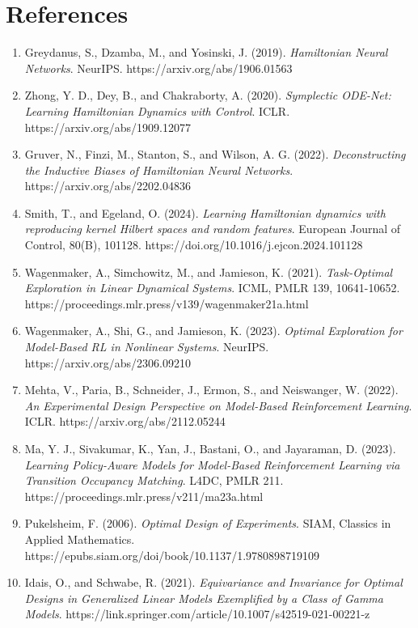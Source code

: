 \documentclass[
  10pt,
]{article}
\providecommand{\tightlist}{%
  \setlength{\itemsep}{0pt}\setlength{\parskip}{0pt}}
\begin{document}
\clearpage

\hypertarget{references}{%
\section*{References}\label{references}}

\begin{enumerate}
\def\labelenumi{\arabic{enumi}.}
\tightlist
\item
  Greydanus, S., Dzamba, M., and Yosinski, J. (2019). \emph{Hamiltonian
  Neural Networks}. NeurIPS. https://arxiv.org/abs/1906.01563
\item
  Zhong, Y. D., Dey, B., and Chakraborty, A. (2020). \emph{Symplectic
  ODE-Net: Learning Hamiltonian Dynamics with Control}. ICLR.
  https://arxiv.org/abs/1909.12077
\item
  Gruver, N., Finzi, M., Stanton, S., and Wilson, A. G. (2022).
  \emph{Deconstructing the Inductive Biases of Hamiltonian Neural
  Networks}. https://arxiv.org/abs/2202.04836
\item
  Smith, T., and Egeland, O. (2024). \emph{Learning Hamiltonian dynamics
  with reproducing kernel Hilbert spaces and random features}. European
  Journal of Control, 80(B), 101128.
  https://doi.org/10.1016/j.ejcon.2024.101128
\item
  Wagenmaker, A., Simchowitz, M., and Jamieson, K. (2021).
  \emph{Task-Optimal Exploration in Linear Dynamical Systems}. ICML,
  PMLR 139, 10641-10652.
  https://proceedings.mlr.press/v139/wagenmaker21a.html
\item
  Wagenmaker, A., Shi, G., and Jamieson, K. (2023). \emph{Optimal
  Exploration for Model-Based RL in Nonlinear Systems}. NeurIPS.
  https://arxiv.org/abs/2306.09210
\item
  Mehta, V., Paria, B., Schneider, J., Ermon, S., and Neiswanger, W.
  (2022). \emph{An Experimental Design Perspective on Model-Based
  Reinforcement Learning}. ICLR. https://arxiv.org/abs/2112.05244
\item
  Ma, Y. J., Sivakumar, K., Yan, J., Bastani, O., and Jayaraman, D.
  (2023). \emph{Learning Policy-Aware Models for Model-Based
  Reinforcement Learning via Transition Occupancy Matching}. L4DC, PMLR
  211. https://proceedings.mlr.press/v211/ma23a.html
\item
  Pukelsheim, F. (2006). \emph{Optimal Design of Experiments}. SIAM,
  Classics in Applied Mathematics.
  https://epubs.siam.org/doi/book/10.1137/1.9780898719109
\item
  Idais, O., and Schwabe, R. (2021). \emph{Equivariance and Invariance
  for Optimal Designs in Generalized Linear Models Exemplified by a
  Class of Gamma Models}.
  https://link.springer.com/article/10.1007/s42519-021-00221-z
\end{enumerate}
\end{document}
